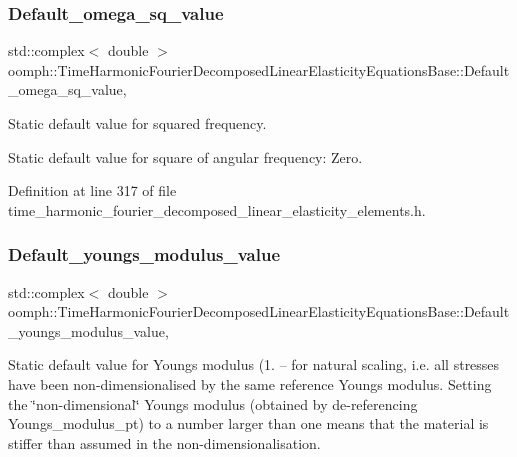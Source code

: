 \subsubsection{\texorpdfstring{Default\+\_\+omega\+\_\+sq\+\_\+value}{Default\_omega\_sq\_value}}
{\footnotesize\ttfamily std\+::complex$<$ double $>$ oomph\+::\+Time\+Harmonic\+Fourier\+Decomposed\+Linear\+Elasticity\+Equations\+Base\+::\+Default\+\_\+omega\+\_\+sq\+\_\+value\hspace{0.3cm}{\ttfamily [static]}, {\ttfamily [protected]}}



Static default value for squared frequency. 

Static default value for square of angular frequency\+: Zero. 

Definition at line 317 of file time\+\_\+harmonic\+\_\+fourier\+\_\+decomposed\+\_\+linear\+\_\+elasticity\+\_\+elements.\+h.

\mbox{\label{classoomph_1_1TimeHarmonicFourierDecomposedLinearElasticityEquationsBase_a3c4db38ac630e9db8d87ca33a0655e5b}} 
\subsubsection{\texorpdfstring{Default\+\_\+youngs\+\_\+modulus\+\_\+value}{Default\_youngs\_modulus\_value}}
{\footnotesize\ttfamily std\+::complex$<$ double $>$ oomph\+::\+Time\+Harmonic\+Fourier\+Decomposed\+Linear\+Elasticity\+Equations\+Base\+::\+Default\+\_\+youngs\+\_\+modulus\+\_\+value\hspace{0.3cm}{\ttfamily [static]}, {\ttfamily [protected]}}

Static default value for Young\textquotesingle{}s modulus (1. -- for natural scaling, i.\+e. all stresses have been non-\/dimensionalised by the same reference Young\textquotesingle{}s modulus. Setting the \char`\"{}non-\/dimensional\char`\"{} Young\textquotesingle{}s modulus (obtained by de-\/referencing Youngs\+\_\+modulus\+\_\+pt) to a number larger than one means that the material is stiffer than assumed in the non-\/dimensionalisation. 

